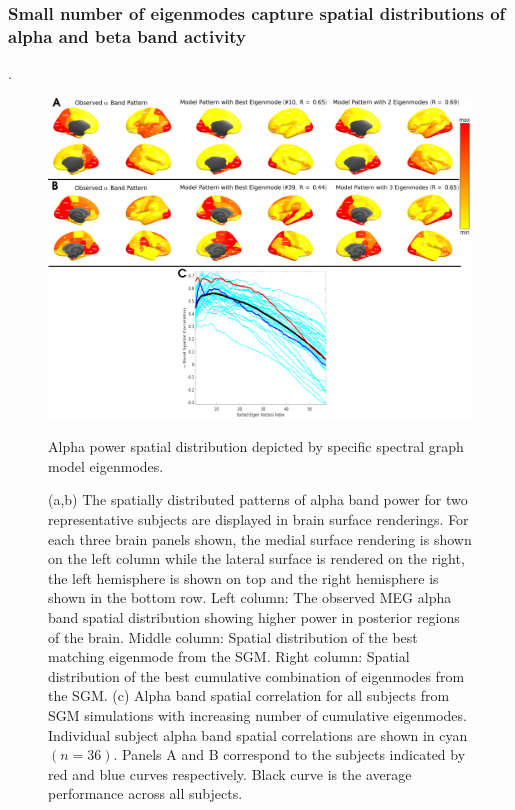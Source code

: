 \subsubsection{Small number of eigenmodes capture spatial distributions of
alpha and beta band activity}.

\begin{figure}[htbp]
    \centering
    \includegraphics[width=\textwidth]{../figures/chapter5/fig5_alpha.png}
    \caption{Alpha power spatial distribution depicted by specific spectral graph model eigenmodes.}
    \caption*{(a,b) The spatially distributed patterns of alpha band power for two representative subjects are displayed in brain surface renderings. For each three brain panels shown, the medial surface rendering is shown on the left column while the lateral surface is rendered on the right, the left hemisphere is shown on top and the right hemisphere is shown in the bottom row. Left column: The observed MEG alpha band spatial distribution showing higher power in posterior regions of the brain. Middle column: Spatial distribution of the best matching eigenmode from the SGM. Right column: Spatial distribution of the best cumulative combination of eigenmodes from the SGM. (c) Alpha band spatial correlation for all subjects from SGM simulations with increasing number of cumulative eigenmodes. Individual subject alpha band spatial correlations are shown in cyan $(n=36)$. Panels A and B correspond to the subjects indicated by red and blue curves respectively. Black curve is the average performance across all subjects.}
    \label{fig:alpha}
\end{figure}

